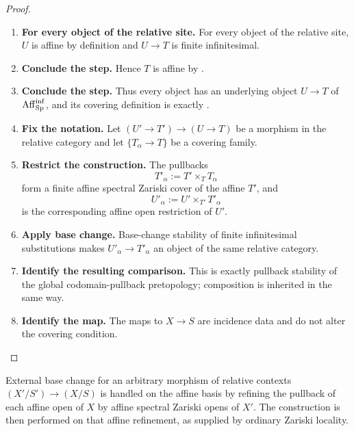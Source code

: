 \begin{proof}
\leavevmode
\begin{enumerate}[label=\textup{(\arabic*)}]
    \item \textbf{For every object of the relative site.}
    For every object of the relative site, \(U\) is affine by definition and \(U\to T\)
    is finite infinitesimal.

    \item \textbf{Conclude the step.}
    Hence \(T\) is affine by .

    \item \textbf{Conclude the step.}
    Thus every object has an underlying object \(U\to T\) of \(\operatorname{Aff}_{\operatorname{Sp}}^{\inf}\), and its covering
    definition is exactly .

    \item \textbf{Fix the notation.}
    Let \((U'\to T')\to(U\to T)\) be a morphism in the relative category and let \(\{T_\alpha\to T\}\) be a covering
    family.

    \item \textbf{Restrict the construction.}
    The pullbacks
    \[
        T'_\alpha:=T'\times_TT_\alpha
    \]
    form a finite affine spectral Zariski cover of the affine \(T'\), and
    \[
        U'_\alpha
        :=U'\times_{T'}T'_\alpha
    \]
    is the corresponding affine open restriction of \(U'\).

    \item \textbf{Apply base change.}
    Base-change stability of finite infinitesimal substitutions makes \(U'_\alpha\to T'_\alpha\) an object of
    the same relative category.

    \item \textbf{Identify the resulting comparison.}
    This is exactly pullback stability of the global codomain-pullback pretopology; composition
    is inherited in the same way.

    \item \textbf{Identify the map.}
    The maps to \(X\to S\) are incidence data and do not alter the covering condition.
\end{enumerate}
\end{proof}

\begin{remark}
\label{rem:relative-infinitesimal-site-external-base-change}
External base change for an arbitrary morphism of relative contexts
\((X'/S')\to(X/S)\) is handled on the affine basis by refining the pullback
of each affine open of \(X\) by affine spectral Zariski opens of \(X'\).
The construction is then performed on that affine refinement, as supplied by
ordinary Zariski locality.
\end{remark}


